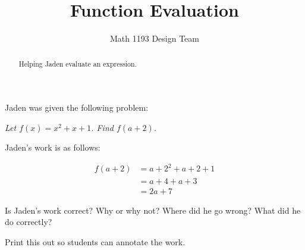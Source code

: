 \documentclass[noauthor]{ximera}
\title{Function Evaluation}
\author{Math 1193 Design Team}
\begin{document}
\begin{abstract}
    Helping Jaden evaluate an expression.
\end{abstract}
\maketitle

Jaden was given the following problem:

\textit{Let \(f(x) = x^2 + x + 1\). Find \(f(a + 2)\).}

Jaden's work is as follows:

\begin{align*}
    f(a + 2) & = a + 2^2 + a + 2 + 1 \\
    & = a + 4 + a + 3 \\
    & = 2a + 7
\end{align*}

Is Jaden's work correct? Why or why not? Where did he 
go wrong? What did he do correctly?

\begin{instructorNotes}
Print this out so students can annotate the work.
\end{instructorNotes}
\end{document}
